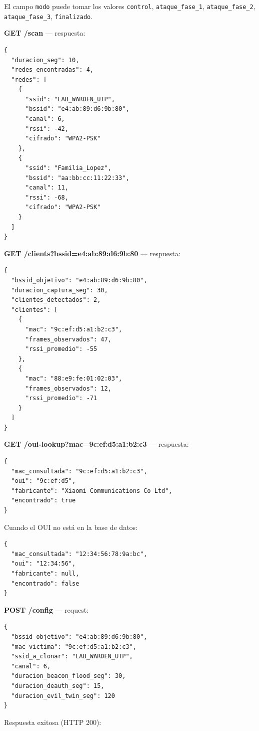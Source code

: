 \documentclass[11pt,a4paper]{article}
\begin{document}
El campo \texttt{modo} puede tomar los valores \texttt{control},
\texttt{ataque\_fase\_1}, \texttt{ataque\_fase\_2},
\texttt{ataque\_fase\_3}, \texttt{finalizado}.

\textbf{GET /scan} — respuesta:

\begin{lstlisting}
{
  "duracion_seg": 10,
  "redes_encontradas": 4,
  "redes": [
    {
      "ssid": "LAB_WARDEN_UTP",
      "bssid": "e4:ab:89:d6:9b:80",
      "canal": 6,
      "rssi": -42,
      "cifrado": "WPA2-PSK"
    },
    {
      "ssid": "Familia_Lopez",
      "bssid": "aa:bb:cc:11:22:33",
      "canal": 11,
      "rssi": -68,
      "cifrado": "WPA2-PSK"
    }
  ]
}
\end{lstlisting}

\textbf{GET /clients?bssid=e4:ab:89:d6:9b:80} — respuesta:

\begin{lstlisting}
{
  "bssid_objetivo": "e4:ab:89:d6:9b:80",
  "duracion_captura_seg": 30,
  "clientes_detectados": 2,
  "clientes": [
    {
      "mac": "9c:ef:d5:a1:b2:c3",
      "frames_observados": 47,
      "rssi_promedio": -55
    },
    {
      "mac": "88:e9:fe:01:02:03",
      "frames_observados": 12,
      "rssi_promedio": -71
    }
  ]
}
\end{lstlisting}

\textbf{GET /oui-lookup?mac=9c:ef:d5:a1:b2:c3} — respuesta:

\begin{lstlisting}
{
  "mac_consultada": "9c:ef:d5:a1:b2:c3",
  "oui": "9c:ef:d5",
  "fabricante": "Xiaomi Communications Co Ltd",
  "encontrado": true
}
\end{lstlisting}

Cuando el OUI no está en la base de datos:

\begin{lstlisting}
{
  "mac_consultada": "12:34:56:78:9a:bc",
  "oui": "12:34:56",
  "fabricante": null,
  "encontrado": false
}
\end{lstlisting}

\textbf{POST /config} — request:

\begin{lstlisting}
{
  "bssid_objetivo": "e4:ab:89:d6:9b:80",
  "mac_victima": "9c:ef:d5:a1:b2:c3",
  "ssid_a_clonar": "LAB_WARDEN_UTP",
  "canal": 6,
  "duracion_beacon_flood_seg": 30,
  "duracion_deauth_seg": 15,
  "duracion_evil_twin_seg": 120
}
\end{lstlisting}

Respuesta exitosa (HTTP 200):
\end{document}
